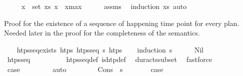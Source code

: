 \begin{isabellebody}
\ \ \ \ \ {\isachardoublequoteopen}{\isasymforall}x\ {\isasymin}\ set\ xs{\isachardot}{\kern0pt}\ x\ {\isasymle}\ x\isactrlsub m\isactrlsub a\isactrlsub x{\isachardoublequoteclose}\isanewline
%
\isadelimproof
\ \ \ \ %
\endisadelimproof
%
\isatagproof
{}\isamarkupfalse%
\ assms\ \isamarkupfalse%
\ {\isacharparenleft}{\kern0pt}induction\ xs{\isacharparenright}{\kern0pt}\ auto%
\endisatagproof
{\isafoldproof}%
%
\isadelimproof
%
\endisadelimproof
%
\begin{isamarkuptext}%
Proof for the existence of a sequence of happening time point for every plan. 
  Needed later in the proof for the completeness of the semantics.%
\end{isamarkuptext}\isamarkuptrue%
\ \ \isamarkupfalse%
\ htps{\isacharunderscore}{\kern0pt}seq{\isacharunderscore}{\kern0pt}exists{\isacharcolon}{\kern0pt}\ {\isachardoublequoteopen}{\isasymexists}htps{\isachardot}{\kern0pt}\ htps{\isacharunderscore}{\kern0pt}seq\ {\isasympi}s\ htps{\isachardoublequoteclose}\isanewline
%
\isadelimproof
\ \ %
\endisadelimproof
%
\isatagproof
{}\isamarkupfalse%
\ {\isacharparenleft}{\kern0pt}induction\ {\isasympi}s{\isacharparenright}{\kern0pt}\isanewline
\ \ \ \ \isamarkupfalse%
\ Nil\isanewline
\ \ \ \ \isamarkupfalse%
\ \isamarkupfalse%
\ {\isachardoublequoteopen}htps{\isacharunderscore}{\kern0pt}seq\ {\isacharbrackleft}{\kern0pt}{\isacharbrackright}{\kern0pt}\ {\isacharbrackleft}{\kern0pt}{\isacharbrackright}{\kern0pt}{\isachardoublequoteclose}\isanewline
\ \ \ \ \ \ \isamarkupfalse%
\ htps{\isacharunderscore}{\kern0pt}seq{\isacharunderscore}{\kern0pt}def\ is{\isacharunderscore}{\kern0pt}htp{\isacharunderscore}{\kern0pt}def\ \isamarkupfalse%
\ dur{\isacharunderscore}{\kern0pt}acts{\isacharunderscore}{\kern0pt}subset\ \isamarkupfalse%
\ fastforce\isanewline
\ \ \ \ \isamarkupfalse%
\ \isamarkupfalse%
\ {\isacharquery}{\kern0pt}case\ \isanewline
\ \ \ \ \ \ \isamarkupfalse%
\ auto\isanewline
\ \ \isamarkupfalse%
\isanewline
\ \ \ \ \isamarkupfalse%
\ {\isacharparenleft}{\kern0pt}Cons\ {\isasympi}\ {\isasympi}s{\isacharparenright}{\kern0pt}\isanewline
\ \ \ \ \isamarkupfalse%
\ \isamarkupfalse%
\ {\isacharquery}{\kern0pt}case\isanewline
\ \ \ \ \isamarkupfalse%

\end{isabellebody}

